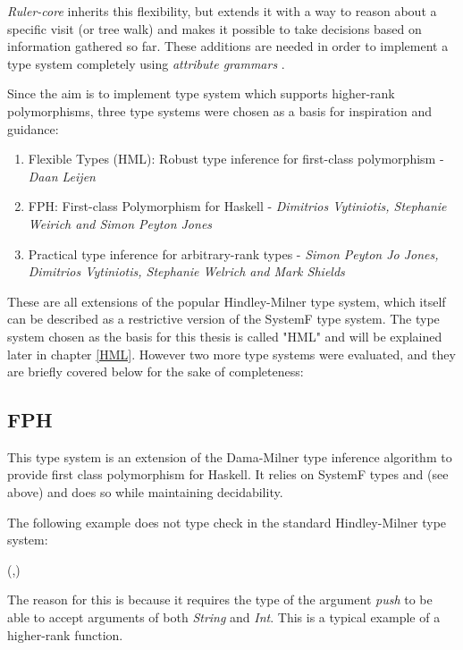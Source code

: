 \documentclass[twoside, titlepage, openright, a4paper]{book}
\newcommand{\Varid}[1]{\mathit{#1}}
\def\resethooks{%
  \global\let\SaveRestoreHook\empty
  \global\let\ColumnHook\empty}
\let\hspre\empty
\let\hspost\empty
\newcommand{\ags}{\emph{attribute grammars }}
\newcommand{\Rcore}{\emph{Ruler-core }}
\begin{document}
\Rcore inherits this flexibility, but extends it with a way to reason about a specific visit (or tree walk) and makes it possible to take decisions based on information gathered so far. These additions are needed in order to implement a type system completely using \ags.

Since the aim is to implement type system which supports higher-rank polymorphisms, three type systems were chosen as a basis for inspiration and guidance:

\begin{enumerate}
\item Flexible Types (HML): Robust type inference for first-class polymorphism - \textit{Daan Leijen}
\item FPH: First-class Polymorphism for Haskell - \textit{Dimitrios Vytiniotis, Stephanie Weirich and Simon Peyton Jones}
\item Practical type inference for arbitrary-rank types - \textit{Simon Peyton Jo Jones, Dimitrios Vytiniotis, Stephanie Welrich and Mark Shields}
\end{enumerate}

These are all extensions of the popular Hindley-Milner type system, which itself can be described as a restrictive version of the SystemF type system.
The type system chosen as the basis for this thesis is called "HML" and will be explained later in chapter \ref{HML}. However two more type systems were evaluated, and they are briefly covered below for the sake of completeness:

\subsection{FPH\cite{FPH}}
This type system is an extension of the Dama-Milner type inference algorithm to provide first class polymorphism for Haskell. It relies on SystemF types and (see above) and does so while maintaining decidability. 

The following example does not type check in the standard Hindley-Milner type system:
\begin{hscode}\SaveRestoreHook
\column{B}{@{}>{\hspre}l<{\hspost}@{}}%
\column{E}{@{}>{\hspre}l<{\hspost}@{}}%
\>[B]{}\Varid{f}\;\Varid{push}\mathrel{=}(\Varid{push}\;,\Varid{push}\;){}\<[E]%
\ColumnHook
\end{hscode}\resethooks

The reason for this is because it requires the type of the argument \textit{push} to be able to accept arguments of both \textit{String} and \textit{Int}. This is a typical example of a higher-rank function. 
\end{document}
